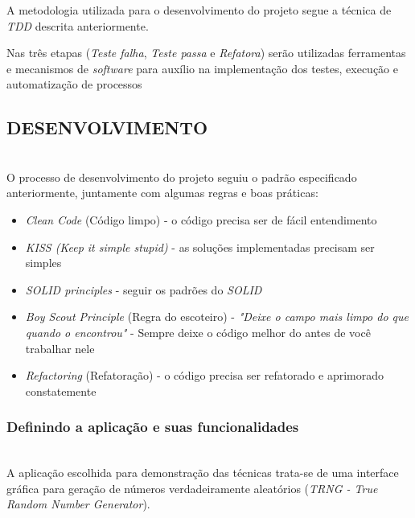 \documentclass[times, twoside, watermark]{artigo}
\begin{document}
A metodologia utilizada para o desenvolvimento do projeto segue a técnica de
\textit{TDD} descrita anteriormente.

Nas três etapas (\textit{Teste falha}, \textit{Teste passa}
e \textit{Refatora}) serão utilizadas ferramentas e mecanismos de \textit{software}
para auxílio na implementação dos testes, execução e automatização de processos \hfill\


\subsection{DESENVOLVIMENTO}\hfill\\

O processo de desenvolvimento do projeto seguiu o padrão especificado anteriormente,
juntamente com algumas regras e boas práticas:

\begin{itemize}
  \item \textit{Clean Code} (Código limpo) - o código precisa ser de fácil
        entendimento\cite{martin2009clean}
  \item \textit{KISS (Keep it simple stupid)} - as soluções implementadas precisam ser
        simples\cite{martin2018clean}
  \item \textit{SOLID principles} - seguir os padrões do \textit{SOLID}
        \cite{martin2002agile}
  \item \textit{Boy Scout Principle} (Regra do escoteiro) - \textit{"Deixe o campo mais
          limpo do que quando o encontrou"} - Sempre deixe o código melhor do antes de você
        trabalhar nele\cite{martin2009clean}
  \item \textit{Refactoring} (Refatoração) - o código precisa ser refatorado e
        aprimorado constatemente\cite{martin2009clean}
\end{itemize}

\subsubsection{Definindo a aplicação e suas funcionalidades}\hfill\\

A aplicação escolhida para demonstração das técnicas trata-se de uma interface
gráfica para geração de números verdadeiramente aleatórios (\textit{TRNG - True 
Random Number Generator}).
\end{document}
